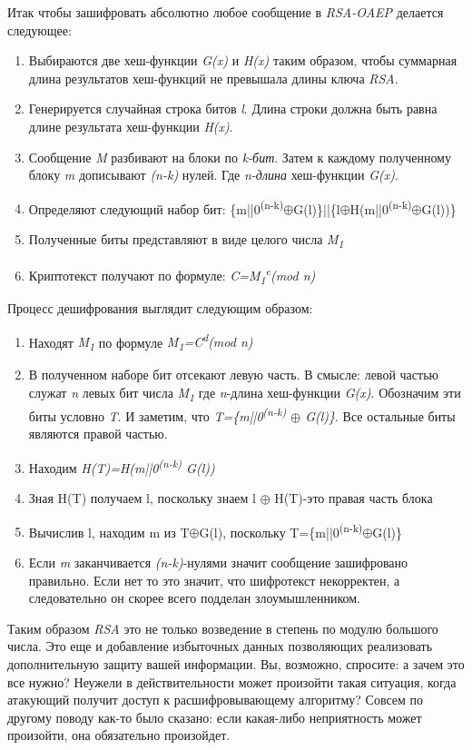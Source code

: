 Итак чтобы зашифровать абсолютно любое сообщение в \textit{RSA-OAEP} делается следующее:
\begin{enumerate}
	\item Выбираются две хеш-функции \textit{G(x)} и \textit{H(x)} таким образом, чтобы суммарная длина результатов хеш-функций не превышала длины ключа \textit{RSA}.
	\item Генерируется случайная строка битов \textit{l}. Длина строки должна быть равна длине результата хеш-функции \textit{H(x)}.
	\item Сообщение \textit{M} разбивают на блоки по \textit{k-бит}. Затем к каждому полученному блоку \textit{m} дописывают \textit{(n-k)} нулей. Где \textit{n-длина} хеш-функции \textit{G(x)}.
	\item Определяют следующий набор бит: \{m||0\textsuperscript{(n-k)}{$\oplus$}G(l)\}||\{l{$\oplus$}H(m||0\textsuperscript{(n-k)}{$\oplus$}G(l))\}
	\item Полученные биты представляют в виде целого числа \textit{M\textsubscript{1}}
	\item Криптотекст получают по формуле: \textit{C=M\textsubscript{1}\textsuperscript{e}(mod n)}
\end{enumerate}

Процесс дешифрования выглядит следующим образом:
\begin{enumerate}
	\item Находят \textit{M\textsubscript{1}} по формуле \textit{M\textsubscript{1}=C\textsuperscript{d}(mod n)}
	\item В полученном наборе бит отсекают левую часть. В смысле: левой частью служат \textit{n} левых бит числа \textit{M\textsubscript{1}} где \textit{n}-длина хеш-функции \textit{G(x)}. Обозначим эти биты условно \textit{T}. И заметим, что \textit{T=\{m||0\textsuperscript{(n-k)} {$\oplus$} G(l)\}}. Все остальные биты являются правой частью.
	\item Находим \textit{H(T)=H(m||0\textsuperscript{(n-k)} G(l))}
	\item Зная H(T) получаем l, поскольку знаем l {$\oplus$} H(T)-это правая часть блока
	\item Вычислив l, находим m из T{$\oplus$}G(l), поскольку T=\{m||0\textsuperscript{(n-k)}{$\oplus$}G(l)\}
	\item Если \textit{m} заканчивается \textit{(n-k)}-нулями значит сообщение зашифровано правильно. Если нет то это значит, что шифротекст некорректен, а следовательно он скорее всего подделан злоумышленником.
\end{enumerate}

Таким образом \textit{RSA} это не только возведение в степень по модулю большого числа. Это еще и добавление избыточных данных позволяющих реализовать дополнительную защиту вашей информации. Вы, возможно, спросите: а зачем это все нужно? Неужели в действительности может произойти такая ситуация, когда атакующий получит доступ к расшифровывающему алгоритму? Совсем по другому поводу как-то было сказано: если какая-либо неприятность может произойти, она обязательно произойдет.